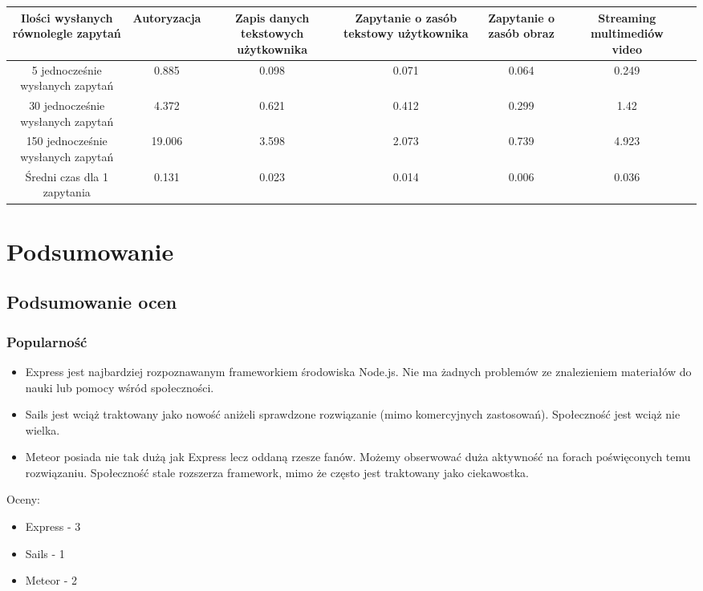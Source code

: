 \documentclass[12pt]{report}
\begin{document}
      \begingroup
        \renewcommand{\arraystretch}{3.8}
        \begin{adjustbox}{center}
          \begin{tabular}{|c|c|c|c|c|c|p{2.6cm}}
            \hline
            \parbox{2.6cm}{Ilości wysłanych równolegle zapytań} & 
            \parbox{2.6cm}{Autoryzacja} & 
            \parbox{2.6cm}{Zapis danych tekstowych użytkownika} & 
            \parbox{2.6cm}{Zapytanie o zasób tekstowy użytkownika} & 
            \parbox{2.6cm}{Zapytanie o zasób obraz} & 
            \parbox{2.6cm}{Streaming multimediów video} \\
            \hline
            \parbox{2.6cm}{5 jednocześnie wysłanych zapytań} & 0.885 & 0.098 & 0.071 & 0.064 & 0.249 \\
            \hline
            \parbox{2.6cm}{30 jednocześnie wysłanych zapytań} & 4.372 & 0.621 & 0.412 & 0.299 & 1.42 \\
            \hline
            \parbox{2.6cm}{150 jednocześnie wysłanych zapytań} & 19.006 & 3.598 & 2.073 & 0.739 & 4.923 \\
            \hline
            \parbox{2.6cm}{Średni czas dla 1 zapytania} & 0.131 & 0.023 & 0.014 & 0.006 & 0.036 \\
            \hline
          \end{tabular}
        \end{adjustbox}
      \endgroup
    
\chapter{Podsumowanie}
  \section{Podsumowanie ocen}
    \subsection{Popularność}
      \begin{itemize}
        \item Express jest najbardziej rozpoznawanym frameworkiem środowiska Node.js. Nie ma żadnych problemów ze znalezieniem materiałów do nauki lub pomocy wśród społeczności.
        \item Sails jest wciąż traktowany jako nowość aniżeli sprawdzone rozwiązanie (mimo komercyjnych zastosowań). Społeczność jest wciąż nie wielka.
        \item Meteor posiada nie tak dużą jak Express lecz oddaną rzesze fanów. Możemy obserwować duża aktywność na forach poświęconych temu rozwiązaniu. Społeczność stale rozszerza framework, mimo że często jest traktowany jako ciekawostka. 
      \end{itemize}
      Oceny:
      \begin{itemize}
        \item Express - 3
        \item Sails - 1
        \item Meteor - 2
      \end{itemize}
\end{document}
